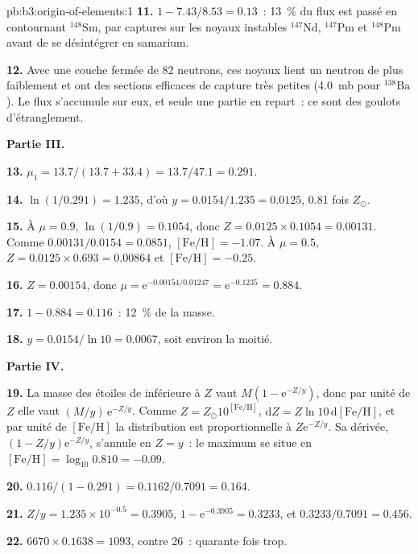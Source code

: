 \begin{solution}{pb:b3:origin-of-elements:1}
\textbf{11.} $1 - 7.43/8.53 = \num{0.13}$~: \qty{13}{\percent} du flux est passé
en contournant $^{148}\mathrm{Sm}$, par captures sur les
noyaux instables $^{147}\mathrm{Nd}$, $^{147}\mathrm{Pm}$ et $^{148}\mathrm{Pm}$ avant
de se désintégrer en samarium.

\textbf{12.} Avec une couche fermée de 82 neutrons, ces noyaux lient un neutron de plus
faiblement et ont des sections efficaces de capture très petites (\qty{4.0}{mb}
pour $^{138}\mathrm{Ba}$). Le flux s'accumule sur eux, et seule une partie
en repart~: ce sont des goulots d'étranglement.

\textbf{Partie III.}

\textbf{13.} $\mu_1 = 13.7/(13.7 + 33.4) = 13.7/47.1 = \num{0.291}$.

\textbf{14.} $\ln(1/0.291) = \num{1.235}$, d'où $y = 0.0154/1.235 = \num{0.0125}$,
\num{0.81} fois $Z_\odot$.

\textbf{15.} À $\mu = 0.9$, $\ln(1/0.9) = 0.1054$, donc $Z = 0.0125\times0.1054 =
\num{0.00131}$. Comme $0.00131/0.0154 = 0.0851$, $[\mathrm{Fe/H}] =
-1.07$. À $\mu = 0.5$, $Z = 0.0125\times0.693 = \num{0.00864}$ et
$[\mathrm{Fe/H}] = -0.25$.

\textbf{16.} $Z = 0.00154$, donc $\mu = \mathrm{e}^{-0.00154/0.01247} =
\mathrm{e}^{-0.1235} = \num{0.884}$.

\textbf{17.} $1 - 0.884 = \num{0.116}$~: \qty{12}{\percent} de la masse.

\textbf{18.} $y = 0.0154/\ln 10 = \num{0.0067}$, soit environ la moitié.

\textbf{Partie IV.}

\textbf{19.} La masse des étoiles de  inférieure à $Z$ vaut
$M(1 - \mathrm{e}^{-Z/y})$, donc par unité de $Z$ elle vaut
$(M/y)\,\mathrm{e}^{-Z/y}$. Comme $Z = Z_\odot10^{[\mathrm{Fe/H}]}$,
$\mathrm{d}Z = Z\ln 10\,\mathrm{d}[\mathrm{Fe/H}]$, et par unité de
$[\mathrm{Fe/H}]$ la distribution est proportionnelle à
$Z\mathrm{e}^{-Z/y}$. Sa dérivée,
$(1 - Z/y)\mathrm{e}^{-Z/y}$, s'annule en $Z = y$~: le maximum se situe en
$[\mathrm{Fe/H}] = \log_{10}0.810 = -0.09$.

\textbf{20.} $\num{0.116}/(1 - 0.291) = 0.1162/0.7091 = \num{0.164}$.

\textbf{21.} $Z/y = 1.235\times10^{-0.5} = 0.3905$, $1 - \mathrm{e}^{-0.3905} =
0.3233$, et $0.3233/0.7091 = \num{0.456}$.

\textbf{22.} $6670\times0.1638 = 1093$, contre 26~: quarante fois trop.


\end{solution}
